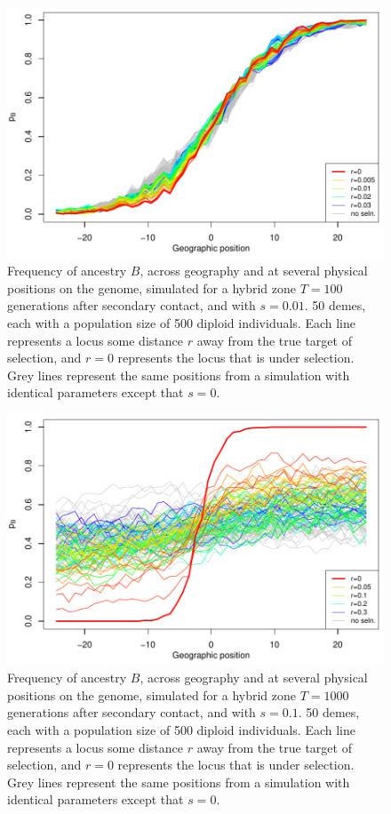 \begin{figure}
\includegraphics{figs/alleleFrequencies_sim_s01_tau100_closely_linked.pdf}
\caption{
    Frequency of ancestry $B$,
    across geography and at several physical positions on the genome, simulated for a hybrid zone
     $T=100$ generations after secondary contact,
    and with $s=0.01$.
        50 demes, each with a population size of 500 diploid individuals.
    Each line represents a locus some distance $r$ away from the true target of selection, 
    and $r=0$ represents the locus that is under selection. Grey lines represent the same positions from a simulation with
    identical parameters except that $s=0$.
}\label{alleleFreq_tau100_weaker_s}
\end{figure}

\begin{figure}
\includegraphics{figs/alleleFrequencies_sim_s1_tau1000.pdf}
\caption{
    Frequency of ancestry $B$,
    across geography and at several physical positions on the genome, simulated for a hybrid zone
     $T=1000$ generations after secondary contact,
    and with $s=0.1$.
        50 demes, each with a population size of 500 diploid individuals.
    Each line represents a locus some distance $r$ away from the true target of selection, 
    and $r=0$ represents the locus that is under selection. Grey lines represent the same positions from a simulation with
    identical parameters except that $s=0$.
 }\label{alleleFreq_tau1000}
\end{figure}




